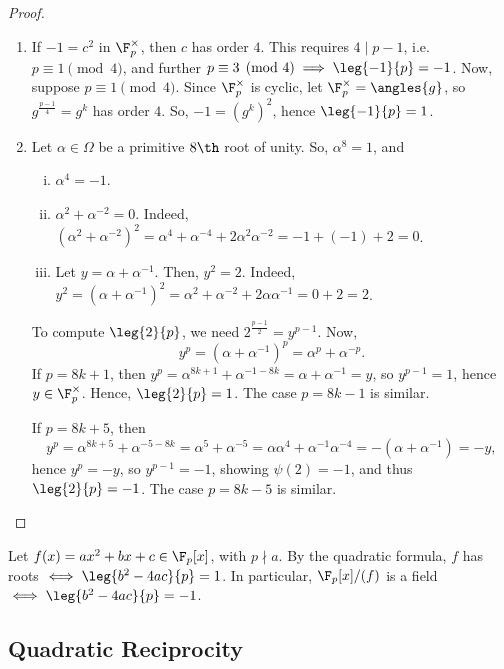 \begin{proof}
    \hfill
    \begin{enumerate}[(1)]
        \item If $-1 = c^2$ in $\F_p^\times$, then $c$ has order $4$. This requires $4 \mid p - 1$, i.e. $p \equiv 1 \pmod 4$, and further $p \equiv 3 \pmod 4 \implies \leg{-1}{p} = -1$. Now, suppose $p \equiv 1 \pmod 4$. Since $\F_p^\times$ is cyclic, let $\F_p^\times = \angles{g}$, so $g^{\frac{p-1}{4}} = g^k$ has order $4$. So, $-1 = (g^k)^2$, hence $\leg{-1}{p} = 1$.
        \item Let $\alpha \in \Omega$ be a primitive $8\th$ root of unity. So, $\alpha^8 = 1$, and
        \begin{enumerate}[(i)]
            \item $\alpha^4 = -1$.
            \item $\alpha^2 + \alpha^{-2} = 0$. Indeed, $(\alpha^2 + \alpha^{-2})^2 = \alpha^4 + \alpha^{-4} + 2\alpha^2\alpha^{-2} = -1 + (-1) + 2 = 0$.
            \item Let $y = \alpha + \alpha^{-1}$. Then, $y^2 = 2$. Indeed, $y^2 = (\alpha + \alpha^{-1})^2 = \alpha^2 + \alpha^{-2} + 2\alpha\alpha^{-1} = 0 + 2 = 2$.
        \end{enumerate}
        To compute $\leg{2}{p}$, we need $2^{\frac{p-1}{2}} = y^{p-1}$. Now,
        $$y^p = (\alpha + \alpha^{-1})^p = \alpha^p + \alpha^{-p}.$$
        If $p = 8k + 1$, then $y^p = \alpha^{8k+1} + \alpha^{-1-8k} = \alpha + \alpha^{-1} = y$, so $y^{p-1} = 1$, hence $y \in \F_p^\times$. Hence, $\leg{2}{p} = 1$. The case $p = 8k - 1$ is similar.

        If $p = 8k + 5$, then
        $$y^p = \alpha^{8k+5} + \alpha^{-5-8k} = \alpha^5 + \alpha^{-5} = \alpha\alpha^4 + \alpha^{-1}\alpha^{-4} = -(\alpha + \alpha^{-1}) = -y,$$
        hence $y^p = -y$, so $y^{p-1} = -1$, showing $\psi(2) = -1$, and thus $\leg{2}{p} = -1$. The case $p = 8k - 5$ is similar.
    \end{enumerate}
\end{proof}

\begin{ex}
    Let $f(x) = ax^2 + bx + c \in \F_p[x]$, with $p \nmid a$. By the quadratic formula, $f$ has roots $\iff \leg{b^2 - 4ac}{p} = 1$. In particular, $\F_p[x]/(f)$ is a field $\iff \leg{b^2-4ac}{p} = -1$.
\end{ex}

\subsection{Quadratic Reciprocity}


